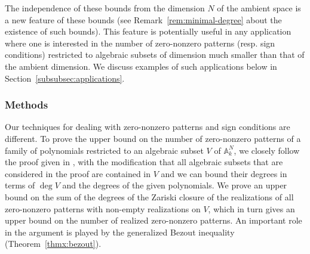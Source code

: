 \documentclass[10pt]{amsart}
\theoremstyle{definition}
\theoremstyle{remark}
\numberwithin{equation}{section}
\begin{document}
The independence of these bounds from the dimension $N$ of the ambient space is a new feature of these bounds (see Remark~\ref{rem:minimal-degree} about the existence of such bounds).
This feature is potentially useful in any application where one is interested in the number of zero-nonzero patterns (resp. sign conditions) restricted to algebraic subsets of dimension much smaller than that of the ambient dimension. 
We discuss examples of such applications below in Section~\ref{subsubsec:applications}.

\subsubsection{Methods}
Our techniques for dealing with zero-nonzero patterns and sign conditions are different. To prove the upper bound on the number of zero-nonzero patterns of a family of polynomials restricted to an algebraic subset $V$ of 
$\mathbb{A}_k^N$, we closely follow the proof given in \cite{Jeronimo-Sabia,BPR-tight}, 
with the modification that all algebraic subsets that are considered 
in the proof are contained in $V$ and we can bound their degrees in terms of $\deg V$ and the degrees of the given polynomials. 
We prove an upper bound on the sum of the degrees of the Zariski closure
of the realizations of all zero-nonzero patterns with non-empty realizations on $V$, which in turn gives an upper bound on the number
of realized zero-nonzero patterns.
An important role in the argument is played by the generalized Bezout inequality (Theorem~\ref{thmx:bezout}). 
\end{document}
